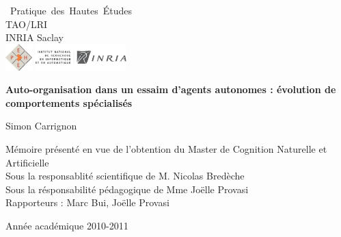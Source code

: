 
\begin{titlepage}
\Large

~Pratique~des~Hautes~Études\\
TAO/LRI\\
INRIA Saclay\\ %
 
 \vfil
 \includegraphics[height=1cm]{images/logo_ephe_large.jpg}
 \hfill \includegraphics[height=1cm]{images/logo_INRIA.png}%
 
 \vfill
 
 
\begin{center}
 {\huge
\textbf{ 
	Auto-organisation dans un essaim d'agents autonomes : évolution de comportements spécialisés
	}
 }
 \vfill
 
 Simon Carrignon 
 

\vfill 
 
{
	\normalsize Mémoire présenté en vue de l'obtention du Master de Cognition Naturelle et Artificielle\\
}
{
	 \normalsize
	\vspace{.5cm}
	\noindent Sous la responsablité scientifique de M. Nicolas Bredèche\\ \noindent Sous la résponsabilité pédagogique de Mme Joëlle Provasi\\
% 

}
{	 
	\normalsize
	\vspace{.5cm}
	Rapporteurs : Marc Bui, Joëlle Provasi\\
	\vfill
}
 
 {\small Année académique 2010-2011 }
\end{center}
\end{titlepage}
